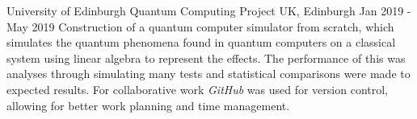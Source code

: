     \cventry
        {University of Edinburgh}
        {Quantum Computing Project}
        {UK, Edinburgh}
        {Jan 2019 - May 2019}
        {
         Construction of a quantum computer simulator from scratch, which simulates the quantum phenomena found in quantum computers on a classical system using linear algebra to represent the effects. The performance of this was analyses through simulating many tests and statistical comparisons were made to expected results. For collaborative work \textit{GitHub} was used for version control, allowing for better work planning and time management.\newline
        }
        